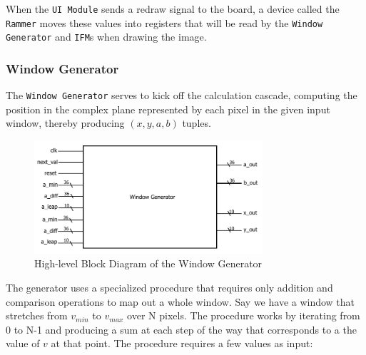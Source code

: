 \documentclass{article}
\begin{document}
When the \texttt{UI Module} sends a redraw signal to the board, a device called the \texttt{Rammer} moves
these values into registers that will be read by the \texttt{Window Generator} and \texttt{IFM}s when drawing
the image.

\subsubsection{Window Generator}

The \texttt{Window Generator} serves to kick off the calculation cascade,
computing the position in the complex plane represented by each pixel in the
given input window, thereby producing 
$(x, y, a, b)$ tuples. 

\begin{figure}
  \centering
    \includegraphics[width=240pt]{block_diagrams/win_gen.pdf}
  \caption{High-level Block Diagram of the Window Generator}
\end{figure}


The generator uses a specialized procedure that requires only addition and comparison
operations to map out a whole window. Say we have a window that stretches from $v_{min}$ to $v_{max}$ over
N pixels. The procedure works by iterating from 0 to N-1 and producing a sum at each step of the way that
corresponds to a the value of $v$ at that point. The procedure requires a few values as input:
\end{document}
